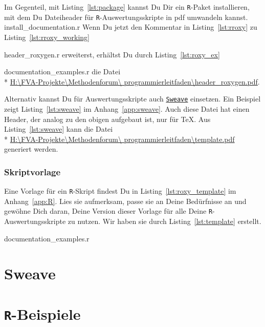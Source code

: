 \documentclass[twoside]{scrreprt}
\providecommand{\R}{\texttt{R}}
\providecommand{\code}[1]{\texttt{#1}}
\providecommand{\proot}{%
H:\textbackslash{}FVA-Projekte\textbackslash{}Methodenforum\textbackslash{}%
}
\providecommand{\pdir}{\proot{}programmierleitfaden\textbackslash{}}
\begin{document}
Im Gegenteil, mit Listing~\ref{lst:package} kannst Du Dir ein \R{}-Paket
installieren, mit dem Du 
Dateiheader 
f\"u{}r \R{}-Auswertungsskripte in pdf 
umwandeln
kannst.
{install_documentation.r}
 Wenn Du jetzt den Kommentar in  Listing~\ref{lst:rroxy} zu
Listing~\ref{lst:rroxy_working} 

{header_roxygen.r}
erweiterst, erh\"altst Du durch
Listing~\ref{lst:roxy_ex} 

{documentation_examples.r} die Datei \\*
\href{%
header_roxygen.pdf}{%
\pdir{}header\_roxygen.pdf}.  

 Alternativ kannst Du f\"u{}r 
Auswertungsskripte auch
\href{http://www.stat.uni-muenchen.de/~leisch/Sweave/}{\code{Sweave}} einsetzen.
Ein Beispiel zeigt Listing~\ref{lst:sweave} im
Anhang~\ref{app:sweave}.
Auch diese Datei hat einen Header, der analog zu den obigen aufgebaut ist, nur
f\"u{}r \TeX{}.
Aus  Listing~\ref{lst:sweave} kann die Datei \\* 
\href{%
template.pdf}{%
\pdir{}template.pdf}  
generiert werden.

\subsection{Skriptvorlage
 }
Eine Vorlage f\"ur ein \R{}-Skript findest Du in Listing~\ref{lst:roxy_template}
im Anhang~\ref{app:R}. 
Lies sie aufmerksam, passe sie an Deine Bed\"u{}rfnisse an und gew\"o{}hne Dich
daran, Deine Version dieser Vorlage f\"u{}r alle Deine \R{}-Auswertungsskripte
zu nutzen.
Wir haben sie durch Listing~\ref{lst:template} erstellt.

{documentation_examples.r}




\printindex
\appendix
\chapter{Sweave\label{app:sweave}}

\pagebreak
\chapter{\R{}-Beispiele\label{app:R}}

%
%
%
\end{document}
